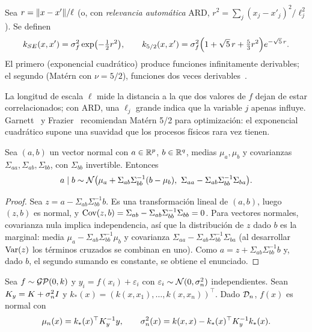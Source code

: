 \begin{definicion}\label{def:nucleos}
Sea $r=\lVert x-x'\rVert/\ell$ (o, con \emph{relevancia automática} ARD, $r^2=\sum_j(x_j-x'_j)^2/\ell_j^2$). Se definen
\[
k_{SE}(x,x')=\sigma_f^2\exp\bigl(-\tfrac12r^2\bigr),\qquad
k_{5/2}(x,x')=\sigma_f^2\Bigl(1+\sqrt5\,r+\tfrac53r^2\Bigr)e^{-\sqrt5\,r}.
\]
El primero (exponencial cuadrático) produce funciones infinitamente derivables; el segundo (Matérn con $\nu=5/2$), funciones dos veces derivables~\cite[cap.~4]{rw}.
\end{definicion}

La longitud de escala $\ell$ mide la distancia a la que dos valores de $f$ dejan de estar correlacionados; con ARD, una $\ell_j$ grande indica que la variable $j$ apenas influye. Garnett~\cite[§3.3]{garnett} y Frazier~\cite[§3.1]{frazier} recomiendan Matérn 5/2 para optimización: el exponencial cuadrático supone una suavidad que los procesos físicos rara vez tienen.

\begin{lema}\label{lem:condicion}
Sea $(a,b)$ un vector normal con $a\in\mathbb{R}^{p}$, $b\in\mathbb{R}^{q}$, medias $\mu_a,\mu_b$ y covarianzas $\Sigma_{aa},\Sigma_{ab},\Sigma_{bb}$, con $\Sigma_{bb}$ invertible. Entonces
\[
a\mid b\sim\N\bigl(\mu_a+\Sigma_{ab}\Sigma_{bb}^{-1}(b-\mu_b),\ \Sigma_{aa}-\Sigma_{ab}\Sigma_{bb}^{-1}\Sigma_{ba}\bigr).
\]
\end{lema}

\begin{proof}
Sea $z=a-\Sigma_{ab}\Sigma_{bb}^{-1}b$. Es una transformación lineal de $(a,b)$, luego $(z,b)$ es normal, y $\operatorname{Cov}(z,b)=\Sigma_{ab}-\Sigma_{ab}\Sigma_{bb}^{-1}\Sigma_{bb}=0$. Para vectores normales, covarianza nula implica independencia, así que la distribución de $z$ dado $b$ es la marginal: media $\mu_a-\Sigma_{ab}\Sigma_{bb}^{-1}\mu_b$ y covarianza $\Sigma_{aa}-\Sigma_{ab}\Sigma_{bb}^{-1}\Sigma_{ba}$ (al desarrollar $\operatorname{Var}(z)$ los términos cruzados se combinan en uno). Como $a=z+\Sigma_{ab}\Sigma_{bb}^{-1}b$ y, dado $b$, el segundo sumando es constante, se obtiene el enunciado.
\end{proof}

\begin{teorema}\label{teo:posterior}
Sea $f\sim\mathcal{GP}(0,k)$ y $y_i=f(x_i)+\varepsilon_i$ con $\varepsilon_i\sim\mathcal{N}(0,\sigma_n^2)$ independientes. Sean $K_{y}=K+\sigma_n^2I$ y $k_*(x)=(k(x,x_1),\dots,k(x,x_n))^\top$. Dado $\mathcal{D}_n$, $f(x)$ es normal con
\[
\mu_n(x)=k_*(x)^\top K_{y}^{-1}y,\qquad \sigma_n^2(x)=k(x,x)-k_*(x)^\top K_{y}^{-1}k_*(x).
\]
\end{teorema}

